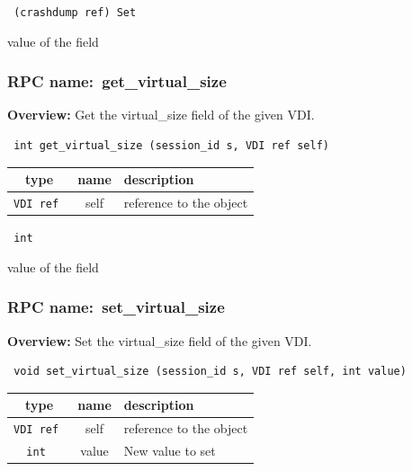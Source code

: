 \vspace{0.3cm}

{\tt 
(crashdump ref) Set
}


value of the field
\vspace{0.3cm}
\vspace{0.3cm}
\vspace{0.3cm}
\subsubsection{RPC name:~get\_virtual\_size}

{\bf Overview:} 
Get the virtual\_size field of the given VDI.

\begin{verbatim} int get_virtual_size (session_id s, VDI ref self)\end{verbatim}



 
\vspace{0.3cm}
\begin{tabular}{|c|c|p{7cm}|}
 \hline
{\bf type} & {\bf name} & {\bf description} \\ \hline
{\tt VDI ref } & self & reference to the object \\ \hline 

\end{tabular}

\vspace{0.3cm}

{\tt 
int
}


value of the field
\vspace{0.3cm}
\vspace{0.3cm}
\vspace{0.3cm}
\subsubsection{RPC name:~set\_virtual\_size}

{\bf Overview:} 
Set the virtual\_size field of the given VDI.

\begin{verbatim} void set_virtual_size (session_id s, VDI ref self, int value)\end{verbatim}



 
\vspace{0.3cm}
\begin{tabular}{|c|c|p{7cm}|}
 \hline
{\bf type} & {\bf name} & {\bf description} \\ \hline
{\tt VDI ref } & self & reference to the object \\ \hline 

{\tt int } & value & New value to set \\ \hline 

\end{tabular}


